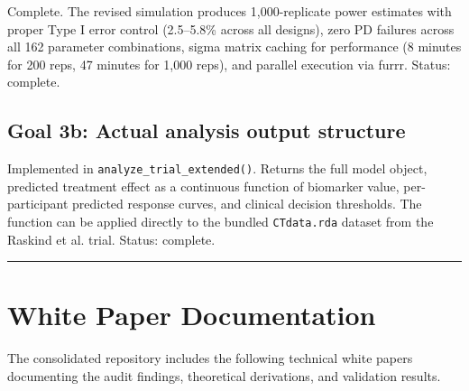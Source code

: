\documentclass[11pt]{article}
\begin{document}
Complete. The revised simulation produces 1,000-replicate
power estimates with proper Type I error control (2.5--5.8\%
across all designs), zero PD failures across all 162 parameter
combinations, sigma matrix caching for performance (8 minutes
for 200 reps, 47 minutes for 1,000 reps), and parallel
execution via furrr. Status: complete.

\subsection{Goal 3b: Actual analysis output structure}

Implemented in \texttt{analyze\_trial\_extended()}. Returns the full
model object, predicted treatment effect as a continuous
function of biomarker value, per-participant predicted response
curves, and clinical decision thresholds. The function can be
applied directly to the bundled \texttt{CTdata.rda} dataset from the
Raskind et al. trial. Status: complete.

\bigskip\noindent\rule{\textwidth}{0.4pt}\bigskip

\section{White Paper Documentation}

The consolidated repository includes the following technical
white papers documenting the audit findings, theoretical
derivations, and validation results.
\end{document}
